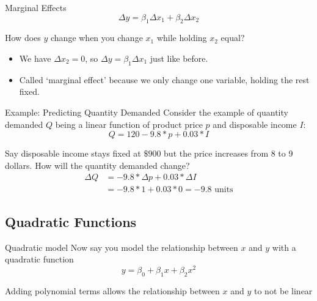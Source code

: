 \documentclass[aspectratio=169,t,11pt,table]{beamer}
\begin{document}
\begin{frame}{Marginal Effects}
  \vspace*{-2\bigskipamount}
  $$
    \Delta y = \beta_1 \Delta x_1 + \beta_2 \Delta x_2
  $$

  How does $y$ change when you change $x_1$ while holding $x_2$ equal?
  \begin{itemize}
    \item We have $\Delta x_2 = 0$, so $\Delta y = \beta_1 \Delta x_1$ just like before. 

    \item Called `marginal effect' because we only change one variable, holding the rest fixed.
  \end{itemize}
\end{frame}

\begin{frame}{Example: Predicting Quantity Demanded}
  Consider the example of quantity demanded $Q$ being a linear function of product price $p$ and disposable income $I$:
  $$
    Q = 120 - 9.8 * p + 0.03 * I
  $$

  Say disposable income stays fixed at $\$900$ but the price increases from 8 to 9 dollars. How will the quantity demanded change?
  \pause
  \begin{align*}
    \Delta Q 
    &= -9.8 * \Delta p + 0.03 * \Delta I \\
    &= -9.8 * 1 + 0.03 * 0 = -9.8 \text{ units}
  \end{align*}
\end{frame}


\subsection*{Quadratic Functions}

\begin{frame}{Quadratic model}
  Now say you model the relationship between $x$ and $y$ with a quadratic function
  $$
    y = \beta_0 + \beta_1 x + \beta_2 x^2
  $$

  \bigskip
  Adding polynomial terms allows the relationship between $x$ and $y$ to not be linear 
\end{frame}
\end{document}
